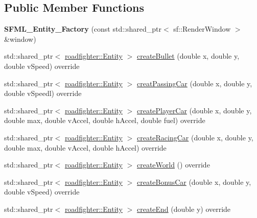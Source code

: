 \subsection*{Public Member Functions}
\begin{DoxyCompactItemize}
\item 
\mbox{\label{classSFML__Entity__Factory_a615be01ab0a89f1cc1c8684ad38b94ae}} 
{\bfseries S\+F\+M\+L\+\_\+\+Entity\+\_\+\+Factory} (const std\+::shared\+\_\+ptr$<$ sf\+::\+Render\+Window $>$ \&window)
\item 
std\+::shared\+\_\+ptr$<$ \hyperlink{classroadfighter_1_1Entity}{roadfighter\+::\+Entity} $>$ \hyperlink{classSFML__Entity__Factory_ab80783626b22a7746a8e9dd49e48e898}{create\+Bullet} (double x, double y, double v\+Speed) override
\item 
std\+::shared\+\_\+ptr$<$ \hyperlink{classroadfighter_1_1Entity}{roadfighter\+::\+Entity} $>$ \hyperlink{classSFML__Entity__Factory_afe1acae3b9c6d07ac30426a72ad390d0}{creat\+Passing\+Car} (double x, double y, double v\+Speedl) override
\item 
std\+::shared\+\_\+ptr$<$ \hyperlink{classroadfighter_1_1Entity}{roadfighter\+::\+Entity} $>$ \hyperlink{classSFML__Entity__Factory_a3c45cdbbfb31525bcdbee0ce87948236}{create\+Player\+Car} (double x, double y, double max, double v\+Accel, double h\+Accel, double fuel) override
\item 
std\+::shared\+\_\+ptr$<$ \hyperlink{classroadfighter_1_1Entity}{roadfighter\+::\+Entity} $>$ \hyperlink{classSFML__Entity__Factory_ac65176cfefa77f5f4af79f88ed244478}{create\+Racing\+Car} (double x, double y, double max, double v\+Accel, double h\+Accel) override
\item 
std\+::shared\+\_\+ptr$<$ \hyperlink{classroadfighter_1_1Entity}{roadfighter\+::\+Entity} $>$ \hyperlink{classSFML__Entity__Factory_a3a6743085eb4c1793be523fe07724328}{create\+World} () override
\item 
std\+::shared\+\_\+ptr$<$ \hyperlink{classroadfighter_1_1Entity}{roadfighter\+::\+Entity} $>$ \hyperlink{classSFML__Entity__Factory_af6fb01565b73487c90d93bc820603ca2}{create\+Bonus\+Car} (double x, double y, double v\+Speed) override
\item 
std\+::shared\+\_\+ptr$<$ \hyperlink{classroadfighter_1_1Entity}{roadfighter\+::\+Entity} $>$ \hyperlink{classSFML__Entity__Factory_af484c4ae7c9a82c171eb047fb05aa350}{create\+End} (double y) override
\end{DoxyCompactItemize}


